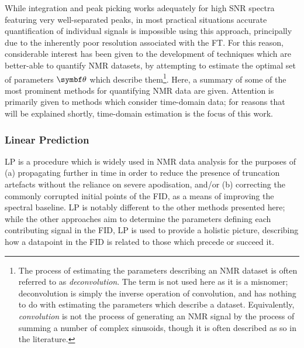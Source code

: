 While integration and peak picking works adequately for high \ac{SNR} spectra
featuring very well-separated peaks, in most practical situations accurate
quantification of individual signals is impossible using this approach,
principally due to the inherently poor resolution associated with the
\ac{FT}.
For this reason, considerable interest has been given to the development of
techniques which are better-able to quantify \ac{NMR} datasets, by attempting
to estimate the optimal set of parameters $\bth$ which describe them\footnote{
    The process of estimating the parameters describing an \ac{NMR}
    dataset is often referred to as \emph{deconvolution}. The term is not used
    here as it is a misnomer; deconvolution is simply the inverse operation of
    convolution, and has nothing to do with estimating the parameters which
    describe a dataset. Equivalently, \emph{convolution} is not the process of
    generating an \ac{NMR} signal by the process of summing a number of complex
    sinusoids, though it is often described as so in the literature.
}.
Here, a summary of some of the most prominent methods for quantifying \ac{NMR}
data are given. Attention is primarily given to methods which consider
time-domain data; for reasons that will be explained shortly, time-domain
estimation is the focus of this work.

\subsubsection{Linear Prediction}
\Ac{LP}\cite{Stephenson1988,Koehl1999,Marion1989b,Zhu1992} is a procedure which
is widely used in \ac{NMR} data analysis for the purposes of (a) propagating
 further in time in order to reduce the presence of truncation
artefacts without the reliance on severe apodisation, and/or (b) correcting the
commonly corrupted initial points of the \ac{FID}, as a means of improving the
spectral baseline. \ac{LP} is notably different to the other methods presented
here; while the other approaches aim to determine the parameters defining each
contributing signal in the \ac{FID}, \ac{LP} is used to provide a holistic
picture, describing how a datapoint in the \ac{FID} is related to those
which precede or succeed it.

